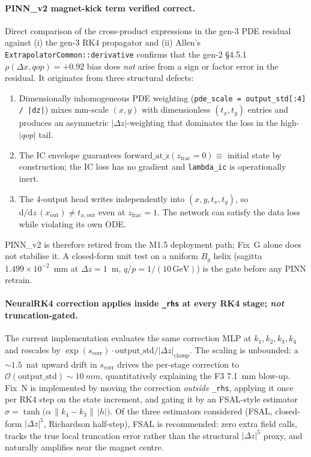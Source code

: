 \documentclass[a4paper,11pt]{article}
\newcommand{\SI}[2]{#1~#2}
\newcommand{\dz}{\Delta z}
\begin{document}
\paragraph{PINN\_v2 magnet-kick term verified correct.}  Direct
comparison of the cross-product expressions in the gen-3 PDE
residual against (i) the gen-3 RK4 propagator and (ii)
Allen's \texttt{ExtrapolatorCommon::derivative} confirms that the
gen-2 \S4.5.1 $\rho(\Delta x, qop) = +0.92$ bias does \emph{not}
arise from a sign or factor error in the residual.  It originates
from three structural defects:
\begin{enumerate}\setlength{\itemsep}{0pt}
  \item Dimensionally inhomogeneous PDE weighting
        (\texttt{pde\_scale = output\_std[:4] / |dz|}) mixes
        mm-scale $(x,y)$ with dimensionless $(t_x,t_y)$ entries
        and produces an asymmetric $|\dz|$-weighting that
        dominates the loss in the high-$|qop|$ tail.
  \item The IC envelope guarantees
        $\mathrm{forward\_at\_z}(z_\mathrm{frac}=0)\equiv$
        initial state by construction; the IC loss has no
        gradient and \texttt{lambda\_ic} is operationally inert.
  \item The 4-output head writes independently into
        $(x,y,t_x,t_y)$, so $\mathrm{d}/\mathrm{d}z\,(x_\mathrm{out})\neq t_{x,\mathrm{out}}$ even
        at $z_\mathrm{frac}=1$.  The network can satisfy the
        data loss while violating its own ODE.
\end{enumerate}
PINN\_v2 is therefore retired from the M1.5 deployment path; Fix~G
alone does not stabilise it.  A closed-form unit test on a
uniform $B_y$ helix (sagitta $1.499{\times}10^{-2}$~mm at
$\dz=1$~m, $q/p=1/(10\,\mathrm{GeV})$) is the gate before any PINN
retrain.

\paragraph{NeuralRK4 correction applies inside \texttt{\_rhs} at
every RK4 stage; \emph{not} truncation-gated.}  The current
implementation evaluates the same correction MLP at $k_1,k_2,k_3,k_4$
and rescales by $\exp(s_\mathrm{corr})\cdot
\mathrm{output\_std}/|\dz|_\mathrm{clamp}$.  The scaling is
unbounded: a $\sim 1.5$~nat upward drift in $s_\mathrm{corr}$
drives the per-stage correction to $\mathcal{O}(\mathrm{output\_std})\sim\SI{10}{mm}$,
quantitatively explaining the F3 \SI{7.1}{mm} blow-up.  Fix~N is
implemented by moving the correction \emph{outside} \texttt{\_rhs},
applying it once per RK4 step on the state increment, and gating
it by an FSAL-style estimator
$\sigma=\tanh\!\bigl(\alpha\,\|k_4-k_3\|\,|h|\bigr)$.  Of the three
estimators considered (FSAL, closed-form $|\dz|^5$, Richardson
half-step), FSAL is recommended: zero extra field calls, tracks
the true local truncation error rather than the structural
$|\dz|^5$ proxy, and naturally amplifies near the magnet centre.
\end{document}
